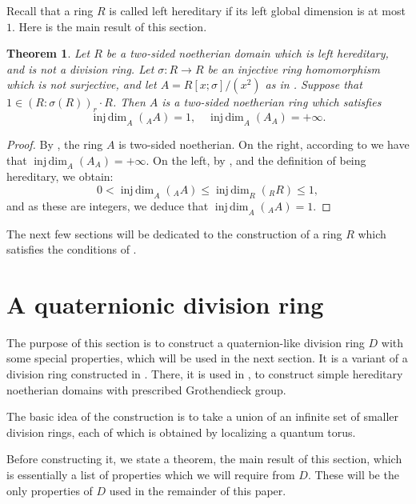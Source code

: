 \documentclass{amsart}
\newtheorem{thm}[equation]{Theorem}
\theoremstyle{definition}
\newcommand{\injdim}{\operatorname{inj\,dim}}
\numberwithin{equation}{section}
\begin{document}
Recall that a ring $R$ is called left hereditary if its left global dimension is at most $1$.
Here is the main result of this section.

\begin{thm}\label{thm:main-gen-const}
Let $R$ be a two-sided noetherian domain which is left hereditary, and is not a division ring. 
Let $\sigma:R \to R$ be an injective ring homomorphism which is not surjective,
and let $A = R[x;\sigma]/(x^2)$ as in .
Suppose that 
$1 \in (R:\sigma(R))_r\cdot R$.
Then $A$ is a two-sided noetherian ring which satisfies
\[
\injdim_A({}_A A) = 1, \quad \injdim_A(A_A) = +\infty.
\]
\end{thm}
\begin{proof}
By , the ring $A$ is two-sided noetherian.
On the right, according to  we have that $\injdim_A(A_A) = +\infty$.
On the left, by ,  and the definition of being hereditary, we obtain:
\[
0 < \injdim_A({}_A A) \le \injdim_R({}_R R) \le 1,
\]
and as these are integers, 
we deduce that $\injdim_A({}_A A) = 1$.
\end{proof}

The next few sections will be dedicated to the construction of a ring $R$ which satisfies the conditions of .

\section{A quaternionic division ring}\label{sec:div}

The purpose of this section is to construct a quaternion-like division ring $D$ with some special properties, which will be used in the next section. It is a variant of a division ring constructed in \cite[Page 13, after Lemma 4.3]{SW}.
There, it is used in \cite[Theorem 4.11]{SW}, 
to construct simple hereditary noetherian domains with prescribed Grothendieck group.

The basic idea of the construction is to take a union of an infinite set of smaller division rings,
each of which is obtained by localizing a quantum torus.

Before constructing it, we state a theorem,
the main result of this section, 
which is essentially a list of properties which we will require from $D$.
These will be the only properties of $D$ used in the remainder of this paper.
\end{document}
